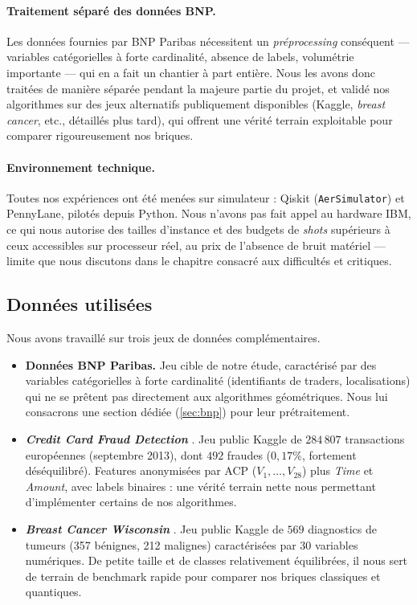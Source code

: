 \documentclass[a4paper]{article}
\begin{document}
\paragraph{Traitement séparé des données BNP.} Les données fournies par BNP Paribas nécessitent un \emph{préprocessing} conséquent --- variables catégorielles à forte cardinalité, absence de labels, volumétrie importante --- qui en a fait un chantier à part entière. Nous les avons donc traitées de manière séparée pendant la majeure partie du projet, et validé nos algorithmes sur des jeux alternatifs publiquement disponibles (Kaggle, \emph{breast cancer}, etc., détaillés plus tard), qui offrent une vérité terrain exploitable pour comparer rigoureusement nos briques.

\paragraph{Environnement technique.} Toutes nos expériences ont été menées sur simulateur : Qiskit (\texttt{AerSimulator}) et PennyLane, pilotés depuis Python. Nous n'avons pas fait appel au hardware IBM, ce qui nous autorise des tailles d'instance et des budgets de \textit{shots} supérieurs à ceux accessibles sur processeur réel, au prix de l'absence de bruit matériel --- limite que nous discutons dans le chapitre consacré aux difficultés et critiques.

\subsection{Données utilisées}

Nous avons travaillé sur trois jeux de données complémentaires.

\begin{itemize}
    \item \textbf{Données BNP Paribas.} Jeu cible de notre étude, caractérisé par des variables catégorielles à forte cardinalité (identifiants de traders, localisations) qui ne se prêtent pas directement aux algorithmes géométriques. Nous lui consacrons une section dédiée (\ref{sec:bnp}) pour leur prétraitement.
    \item \textbf{\emph{Credit Card Fraud Detection}} \cite{ulb_creditcard}. Jeu public Kaggle de $284\,807$ transactions européennes (septembre 2013), dont $492$ fraudes ($0{,}17\%$, fortement déséquilibré). Features anonymisées par ACP ($V_1, \dots, V_{28}$) plus \emph{Time} et \emph{Amount}, avec labels binaires : une vérité terrain nette nous permettant d'implémenter certains de nos algorithmes.
    \item \textbf{\emph{Breast Cancer Wisconsin}} \cite{breast_cancer_kaggle}. Jeu public Kaggle de $569$ diagnostics de tumeurs (357 bénignes, 212 malignes) caractérisées par $30$ variables numériques. De petite taille et de classes relativement équilibrées, il nous sert de terrain de benchmark rapide pour comparer nos briques classiques et quantiques.
\end{itemize}
\end{document}
